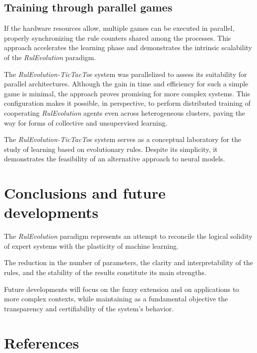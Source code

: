 \documentclass[12pt,a4paper]{article}
\begin{document}
\subsection{Training through parallel games}

If the hardware resources allow, multiple games can be executed in parallel, properly synchronizing the rule counters shared among the processes.  
This approach accelerates the learning phase and demonstrates the intrinsic scalability of the \textit{RulEvolution} paradigm.

The \textit{RulEvolution-TicTacToe} system was parallelized to assess its suitability for parallel architectures.  
Although the gain in time and efficiency for such a simple game is minimal, the approach proves promising for more complex systems.  
This configuration makes it possible, in perspective, to perform distributed training of cooperating \textit{RulEvolution} agents even across heterogeneous clusters, paving the way for forms of collective and unsupervised learning.

\bigskip
The \textit{RulEvolution-TicTacToe} system serves as a conceptual laboratory for the study of learning based on evolutionary rules.  
Despite its simplicity, it demonstrates the feasibility of an alternative approach to neural models.


\section{Conclusions and future developments}
The \textit{RulEvolution} paradigm represents an attempt to reconcile the logical solidity of expert systems with the plasticity of machine learning.  
  
The reduction in the number of parameters, the clarity and interpretability of the rules, and the stability of the results constitute its main strengths.  
  
Future developments will focus on the fuzzy extension and on applications to more complex contexts, while maintaining as a fundamental objective the transparency and certifiability of the system’s behavior.

\section*{References}
\end{document}
